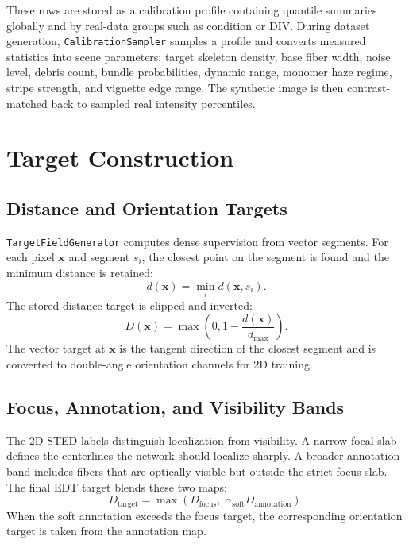 \documentclass[11pt, a4paper]{article}
\begin{document}
These rows are stored as a calibration profile containing quantile summaries
globally and by real-data groups such as condition or DIV. During dataset
generation, \texttt{CalibrationSampler} samples a profile and converts measured
statistics into scene parameters: target skeleton density, base fiber width,
noise level, debris count, bundle probabilities, dynamic range, monomer haze
regime, stripe strength, and vignette edge range. The synthetic image is then
contrast-matched back to sampled real intensity percentiles.

\section{Target Construction}

\subsection{Distance and Orientation Targets}

\texttt{TargetFieldGenerator} computes dense supervision from vector segments.
For each pixel $\bm{x}$ and segment $s_i$, the closest point on the segment is
found and the minimum distance is retained:
\begin{equation}
    d(\bm{x}) = \min_i d(\bm{x}, s_i).
\end{equation}
The stored distance target is clipped and inverted:
\begin{equation}
    D(\bm{x}) = \max\left(0, 1 - \frac{d(\bm{x})}{d_{\max}}\right).
\end{equation}
The vector target at $\bm{x}$ is the tangent direction of the closest segment and
is converted to double-angle orientation channels for 2D training.

\subsection{Focus, Annotation, and Visibility Bands}

The 2D STED labels distinguish localization from visibility. A narrow focal slab
defines the centerlines the network should localize sharply. A broader annotation
band includes fibers that are optically visible but outside the strict focus
slab. The final EDT target blends these two maps:
\begin{equation}
    D_{\text{target}} =
    \max\left(D_{\text{focus}},\;
    \alpha_{\text{soft}} D_{\text{annotation}}\right).
\end{equation}
When the soft annotation exceeds the focus target, the corresponding orientation
target is taken from the annotation map.
\end{document}
